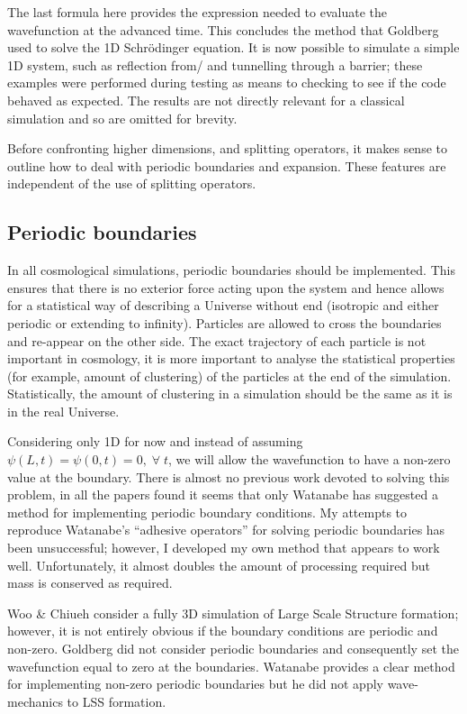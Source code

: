 The last formula here provides the expression needed to evaluate the wavefunction at the advanced time. This concludes the method that Goldberg used to solve the 1D Schr\"odinger equation. It is now possible to simulate a simple 1D system, such as reflection from/ and tunnelling through a barrier; these examples were performed during testing as means to checking to see if the code behaved as expected. The results are not directly relevant for a classical simulation and so are omitted for brevity.

Before confronting higher dimensions, and splitting operators, it makes sense to outline how to deal with periodic boundaries and expansion. These features are independent of the use of splitting operators.

\subsection{Periodic boundaries}
\label{per_bound}
In all cosmological simulations, periodic boundaries should be implemented. This ensures that there is no exterior force acting upon the system and hence allows for a statistical way of describing a Universe without end (isotropic and either periodic or extending to infinity). Particles are allowed to cross the boundaries and re-appear on the other side. The exact trajectory of each particle is not important in cosmology, it is more important to analyse the statistical properties (for example, amount of clustering) of the particles at the end of the simulation. Statistically, the amount of clustering in a simulation should be the same as it is in the real Universe.

Considering only 1D for now and instead of assuming $\psi(L,t) = \psi(0,t) = 0, \; \forall \; t$, we will allow the wavefunction to have a non-zero value at the boundary. There is almost no previous work devoted to solving this problem, in all the papers found it seems that only Watanabe has suggested a method for implementing periodic boundary conditions. My attempts to reproduce Watanabe's ``adhesive operators'' \citep{bib_wat} for solving periodic boundaries has been unsuccessful; however, I developed my own method that appears to work well. Unfortunately, it almost doubles the amount of processing required but mass is conserved as required.

Woo \& Chiueh \citep{bib_wooc} consider a fully 3D simulation of Large Scale Structure formation; however, it is not entirely obvious if the boundary conditions are periodic and non-zero. Goldberg \citep{bib_gold} did not consider periodic boundaries and consequently set the wavefunction equal to zero at the boundaries. Watanabe \citep{bib_wat} provides a clear method for implementing non-zero periodic boundaries but he did not apply wave-mechanics to LSS formation.

